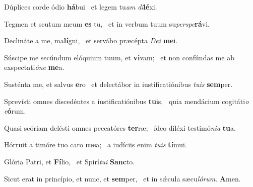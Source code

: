 \item Dúplices corde ódio \textbf{há}bui~\psstar{} et legem tu\textit{am} \textit{di}\textbf{lé}xi.

\item Tegmen et scutum meum \textbf{es} tu,~\psstar{} et in verbum tuum su\textit{perspe}\textbf{rá}vi.

\item Declináte a me, ma\textbf{lí}gni,~\psstar{} et servábo præcépta \textit{Dei} \textbf{me}i.

\item Súscipe me secúndum elóquium tuum, et \textbf{vi}vam;~\psstar{} et non confúndas me ab exspectati\textit{óne} \textbf{me}a.

\item Susténta me, et salvus \textbf{e}ro~\psstar{} et delectábor in iustificatiónibus \textit{tuis} \textbf{sem}per.

\item Sprevísti omnes discedéntes a iustificatiónibus \textbf{tu}is,~\psstar{} quia mendácium cogitáti\textit{o} \textit{e}\textbf{ó}rum.

\item Quasi scóriam delésti omnes peccatóres \textbf{ter}ræ;~\psstar{} ídeo diléxi testimó\textit{nia} \textbf{tu}a.

\item Hórruit a timóre tuo caro \textbf{me}a;~\psstar{} a iudíciis enim \textit{tuis} \textbf{tí}mui.

\item Glória Patri, et \textbf{Fí}lio,~\psstar{} et Spirí\textit{tui} \textbf{Sanc}to.

\item Sicut erat in princípio, et nunc, et \textbf{sem}per,~\psstar{} et in sǽcula sæcu\textit{lórum}. \textbf{A}men.
